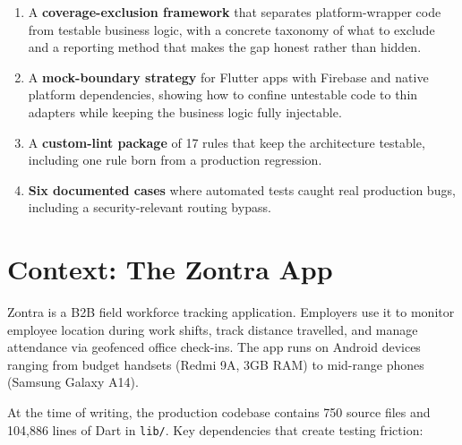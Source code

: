 \documentclass[10pt,journal,compsoc]{IEEEtran}
\begin{document}
\begin{enumerate}
  \item A \textbf{coverage-exclusion framework} that separates
        platform-wrapper code from testable business logic, with a
        concrete taxonomy of what to exclude and a reporting method that
        makes the gap honest rather than hidden.
  \item A \textbf{mock-boundary strategy} for Flutter apps with Firebase
        and native platform dependencies, showing how to confine
        untestable code to thin adapters while keeping the business logic
        fully injectable.
  \item A \textbf{custom-lint package} of 17 rules that keep the
        architecture testable, including one rule born from a production
        regression.
  \item \textbf{Six documented cases} where automated tests caught real
        production bugs, including a security-relevant routing bypass.
\end{enumerate}


\section{Context: The Zontra App}
\label{sec:context}

Zontra is a B2B field workforce tracking application. Employers use it to
monitor employee location during work shifts, track distance travelled,
and manage attendance via geofenced office check-ins. The app runs on
Android devices ranging from budget handsets (Redmi 9A, 3GB RAM) to
mid-range phones (Samsung Galaxy A14).

At the time of writing, the production codebase contains 750 source files
and 104,886 lines of Dart in \texttt{lib/}. Key dependencies that create
testing friction:
\end{document}

